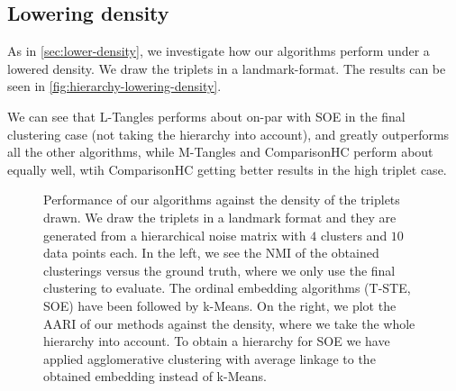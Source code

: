 \subsection{Lowering density}
As in \autoref{sec:lower-density}, we investigate how our algorithms perform under a lowered density. 
We draw the triplets in a landmark-format. The results can be seen in \autoref{fig:hierarchy-lowering-density}. 

We can see that L-Tangles performs about on-par with SOE in the final clustering case (not taking the hierarchy into account), and greatly outperforms all the other 
algorithms, while M-Tangles and ComparisonHC perform about equally well, wtih ComparisonHC getting better results in the high triplet case.

\onecolumn
\begin{figure}[ht]
    \centering
    \caption{
        Performance of our algorithms against the density of the triplets drawn. We draw the triplets in a landmark format 
        and they are generated from a hierarchical noise matrix with $4$ clusters and $10$ data points each. In the left, we see the NMI of 
        the obtained clusterings versus the ground truth, where we only use the final clustering to evaluate. The ordinal embedding algorithms
        (T-STE, SOE) have been followed by k-Means. On the right, 
        we plot the AARI of our methods against the density, where we take the whole hierarchy into account. To obtain a hierarchy for SOE
        we have applied agglomerative clustering with average linkage to the obtained embedding instead of k-Means.
    }
    \label{fig:hierarchy-lowering-density}
\end{figure}

